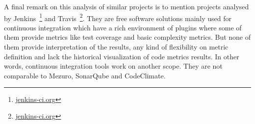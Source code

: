 A final remark on this analysis of similar projects is to mention projects
analysed by Jenkins~\footnote{\url{jenkins-ci.org}} and
Travis~\footnote{\url{jenkins-ci.org}}. They are free software solutions
mainly used for continuous integration which have a rich environment of plugins
where some of them provide metrics like test coverage and basic complexity
metrics. But none of them provide interpretation of the results, any kind of
flexibility on metric definition and lack the historical visualization of
code metrics results. In other words, continuous integration tools work on
another scope. They are not comparable to Mezuro, SonarQube and CodeClimate.
